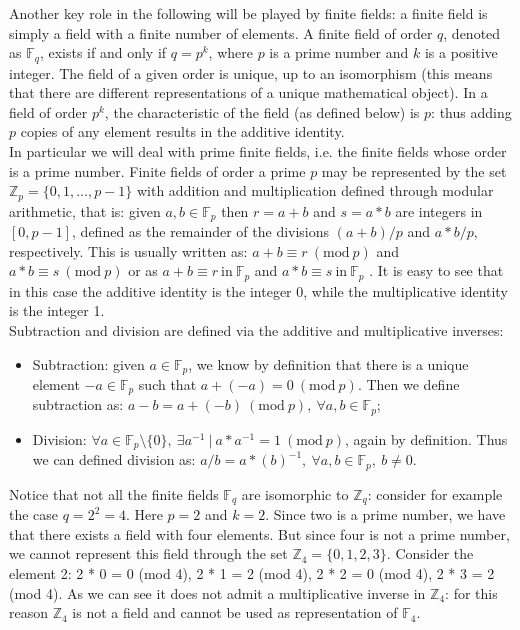 \bigskip
\noindent
Another key role in the following will be played by finite fields: a finite field is simply a field with a finite number of elements. A finite field of order $q$, denoted as $\mathbb{F}_q$, exists if and only if $q = p^k$, where $p$ is a prime number and $k$ is a positive integer. The field of a given order is unique, up to an isomorphism (this means that there are different representations of a unique mathematical object). In a field of order $p^k$, the characteristic of the field (as defined below) is $p$: thus adding $p$ copies of any element results in the additive identity. 
\\
In particular we will deal with prime finite fields, i.e. the finite fields whose order is a prime number. Finite fields of order a prime $p$ may be represented by the set $\mathbb{Z}_p = \{0, 1, ..., p-1\}$ with addition and multiplication defined through modular arithmetic, that is: given $a, b \in \mathbb{F}_p$ then $r = a + b$ and $s = a * b$ are integers in $[0, p - 1]$, defined as the remainder of the divisions $(a + b)/p$ and $a*b/p$, respectively. This is usually written as: $a + b \equiv r \ (\text{mod} \ p)$ and $a * b \equiv s \ (\text{mod} \ p)$ or as $a + b \equiv r \ \text{in} \ \mathbb{F}_p$ and $a * b \equiv s \ \text{in} \ \mathbb{F}_p$ . It is easy to see that in this case the additive identity is the integer 0, while the multiplicative identity is the integer 1.
\\
Subtraction and division are defined via the additive and multiplicative inverses:
\begin{itemize}
	\item Subtraction: given $a \in \mathbb{F}_p$, we know by definition that there is a unique element $-a \in \mathbb{F}_p$ such that $a + (-a) = 0 \ (\text{mod} \ p)$. Then we define subtraction as: $a - b = a + (-b) \ (\text{mod} \ p), \ \forall a, b \in \mathbb{F}_p$;
	\item Division: $\forall a \in \mathbb{F}_p \text{\textbackslash} \{0\}, \ \exists a^{-1} \ | \ a * a^{-1} = 1 \ (\text{mod} \ p)$, again by definition. Thus we can defined division as: $a / b = a * (b)^{-1}, \ \forall a, b \in \mathbb{F}_p, \ b \neq 0$.
\end{itemize}
Notice that not all the finite fields $\mathbb{F}_q$ are isomorphic to $\mathbb{Z}_q$: consider for example the case $q = 2^2 = 4$. Here $p = 2$ and $k = 2$. Since two is a prime number, we have that there exists a field with four elements. But since four is not a prime number, we cannot represent this field through the set $\mathbb{Z}_4 = \{0, 1, 2, 3\}$. Consider the element 2: 2 * 0 = 0 (mod 4), 2 * 1 = 2 (mod 4), 2 * 2 = 0 (mod 4), 2 * 3 = 2 (mod 4). As we can see it does not admit a multiplicative inverse in $\mathbb{Z}_4$: for this reason $\mathbb{Z}_4$ is not a field and cannot be used as representation of $\mathbb{F}_4$.

